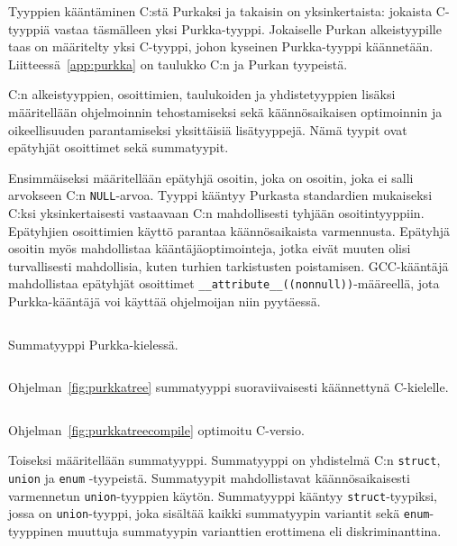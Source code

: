 Tyyppien kääntäminen C:stä Purkaksi ja takaisin on yksinkertaista: jokaista
C-tyyppiä vastaa täsmälleen yksi Purkka-tyyppi. Jokaiselle Purkan
alkeistyypille taas on määritelty yksi C-tyyppi, johon kyseinen Purkka-tyyppi
käännetään. Liitteessä~\ref{app:purkka} on taulukko C:n ja Purkan tyypeistä. 

C:n alkeistyyppien, osoittimien, taulukoiden ja yhdistetyyppien lisäksi
määritellään ohjelmoinnin tehostamiseksi sekä käännösaikaisen optimoinnin ja
oikeellisuuden parantamiseksi yksittäisiä lisätyyppejä. Nämä tyypit ovat
epätyhjät osoittimet sekä summatyypit.

Ensimmäiseksi määritellään epätyhjä osoitin, joka on osoitin, joka ei salli
arvokseen C:n \texttt{NULL}-arvoa. Tyyppi kääntyy Purkasta standardien
mukaiseksi C:ksi yksinkertaisesti vastaavaan C:n mahdollisesti tyhjään
osoitintyyppiin. Epätyhjien osoittimien käyttö parantaa käännösaikaista
varmennusta. Epätyhjä osoitin myös mahdollistaa kääntäjäoptimointeja, jotka
eivät muuten olisi turvallisesti mahdollisia, kuten turhien tarkistusten
poistamisen. GCC-kääntäjä mahdollistaa epätyhjät osoittimet
\texttt{\_\_attribute\_\_((nonnull))}-määreellä, jota Purkka-kääntäjä voi
käyttää ohjelmoijan niin pyytäessä.

\begin{listing}[ht!]
    \inputminted{Rust}{koodi/sumtype.prk}
    \caption{Summatyyppi Purkka-kielessä.}
    \label{fig:purkkatree}
\end{listing}

\begin{listing}[ht!]
    \inputminted{Rust}{koodi/sumtype.c}
    \caption{Ohjelman~\ref{fig:purkkatree} summatyyppi suoraviivaisesti
    käännettynä C-kielelle.}
    \label{fig:purkkatreecompile}
\end{listing}

\begin{listing}[ht!]
    \inputminted{Rust}{koodi/sumtype2.c}
    \caption{Ohjelman~\ref{fig:purkkatreecompile} optimoitu C-versio.}
    \label{fig:purkkatreecompile2}
\end{listing}

Toiseksi määritellään summatyyppi. Summatyyppi on yhdistelmä C:n
\texttt{struct}, \texttt{union} ja \texttt{enum} -tyypeistä. Summatyypit
mahdollistavat käännösaikaisesti varmennetun \texttt{union}-tyyppien käytön.
Summatyyppi kääntyy \texttt{struct}-tyypiksi, jossa on \texttt{union}-tyyppi,
joka sisältää kaikki summatyypin variantit sekä \texttt{enum}-tyyppinen
muuttuja summatyypin varianttien erottimena eli diskriminanttina.

